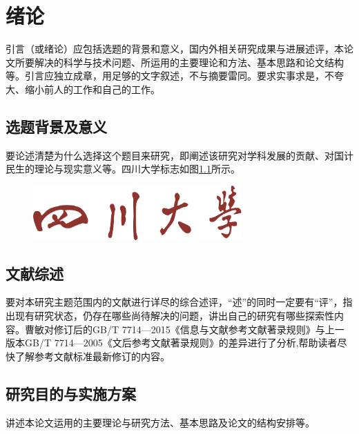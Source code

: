
\chapter{绪论}%
引言（或绪论）应包括选题的背景和意义，国内外相关研究成果与进展述评，本论文所要解决的科学与技术问题、所运用的主要理论和方法、基本思路和论文结构等。引言应独立成章，用足够的文字叙述，不与摘要雷同。要求实事求是，不夸大、缩小前人的工作和自己的工作。
\section{选题背景及意义}
要论述清楚为什么选择这个题目来研究，即阐述该研究对学科发展的贡献、对国计民生的理论与现实意义等。四川大学标志如图\ref{fig:logo}所示。
\begin{figure}[H]
    \includegraphics[width=8cm]{./Template/Components/Images/SCU_TITLE}
    \centering
    \label{fig:logo}
    \end{figure}
\section{文献综述}
要对本研究主题范围内的文献进行详尽的综合述评，“述”的同时一定要有“评”，指出现有研究状态，仍存在哪些尚待解决的问题，讲出自己的研究有哪些探索性内容。曹敏\cite{曹敏GB}对修订后的GB/T 7714—2015《信息与文献参考文献著录规则》与上一版本GB/T 7714—2005《文后参考文献著录规则》的差异进行了分析,帮助读者尽快了解参考文献标准最新修订的内容。
\section{研究目的与实施方案}
讲述本论文运用的主要理论与研究方法、基本思路及论文的结构安排等。

